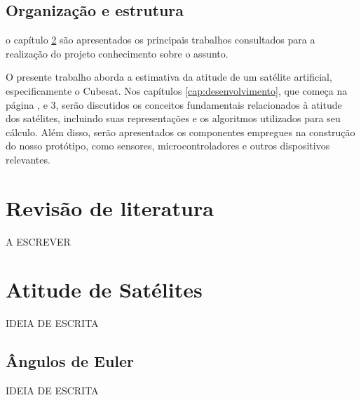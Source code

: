 \documentclass[
	12pt,				%
	openright,			%
	oneside,			%
	a4paper,			%
	english,			%
	brazil				%
	]{abntex2}
\begin{document}
\section{Organização e estrutura}


o capítulo \ref{cap:revisao-de-literatura} são apresentados os principais trabalhos consultados para a realização do projeto conhecimento sobre o assunto.

O presente trabalho aborda a estimativa da atitude de um satélite artificial, especificamente o Cubesat. Nos capítulos \ref{cap:desenvolvimento}, que começa na página \pageref{cap:desenvolvimento}, e 3, serão discutidos os conceitos fundamentais relacionados à atitude dos satélites, incluindo suas representações e os algoritmos utilizados para seu cálculo. Além disso, serão apresentados os componentes empregues na construção do nosso protótipo, como sensores, microcontroladores e outros dispositivos relevantes.


\chapter{Revisão de literatura} \label{cap:revisao-de-literatura}

A ESCREVER

\chapter{Atitude de Satélites}

IDEIA DE ESCRITA

\section{Ângulos de Euler}

IDEIA DE ESCRITA
\end{document}
